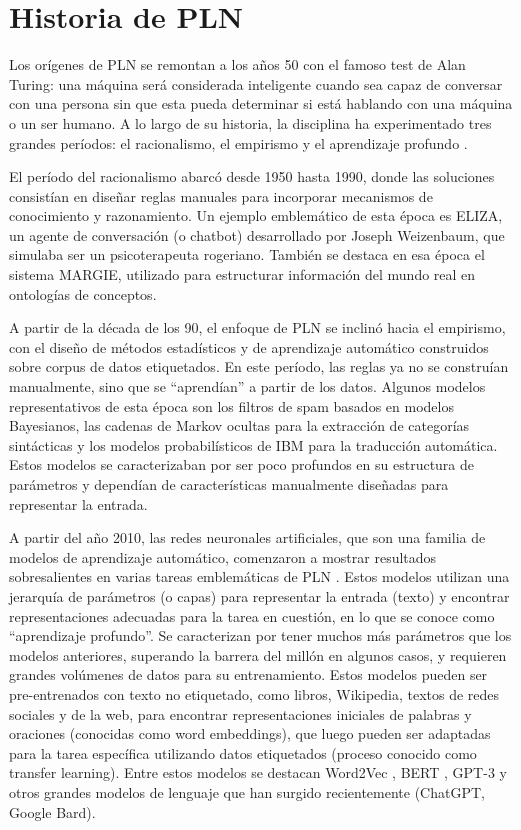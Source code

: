 \section{Historia de PLN}

Los orígenes de PLN se remontan a los años 50 con el famoso test de Alan Turing: una máquina será considerada inteligente cuando sea capaz de conversar con una persona sin que esta pueda determinar si está hablando con una máquina o un ser humano. A lo largo de su historia, la disciplina ha experimentado tres grandes períodos: el racionalismo, el empirismo y el aprendizaje profundo \cite{deng2018deep}.

El período del racionalismo abarcó desde 1950 hasta 1990, donde las soluciones consistían en diseñar reglas manuales para incorporar mecanismos de conocimiento y razonamiento. Un ejemplo emblemático de esta época es ELIZA, un agente de conversación (o chatbot) desarrollado por Joseph Weizenbaum, que simulaba ser un psicoterapeuta rogeriano. También se destaca en esa época el sistema MARGIE, utilizado para estructurar información del mundo real en ontologías de conceptos.

A partir de la década de los 90, el enfoque de PLN se inclinó hacia el empirismo, con el diseño de métodos estadísticos y de aprendizaje automático construidos sobre corpus de datos etiquetados. En este período, las reglas ya no se construían manualmente, sino que se ``aprendían'' a partir de los datos. Algunos modelos representativos de esta época son los filtros de spam basados en modelos Bayesianos, las cadenas de Markov ocultas para la extracción de categorías sintácticas y los modelos probabilísticos de IBM para la traducción automática. Estos modelos se caracterizaban por ser poco profundos en su estructura de parámetros y dependían de características manualmente diseñadas para representar la entrada.

A partir del año 2010, las redes neuronales artificiales, que son una familia de modelos de aprendizaje automático, comenzaron a mostrar resultados sobresalientes en varias tareas emblemáticas de PLN \cite{collobert2011natural}. Estos modelos utilizan una jerarquía de parámetros (o capas) para representar la entrada (texto) y encontrar representaciones adecuadas para la tarea en cuestión, en lo que se conoce como ``aprendizaje profundo''. Se caracterizan por tener muchos más parámetros que los modelos anteriores, superando la barrera del millón en algunos casos, y requieren grandes volúmenes de datos para su entrenamiento. Estos modelos pueden ser pre-entrenados con texto no etiquetado, como libros, Wikipedia, textos de redes sociales y de la web, para encontrar representaciones iniciales de palabras y oraciones (conocidas como word embeddings), que luego pueden ser adaptadas para la tarea específica utilizando datos etiquetados (proceso conocido como transfer learning). Entre estos modelos se destacan Word2Vec \cite{Mikolov2013}, BERT \cite{kenton2019bert}, GPT-3 \cite{brown2020language} y otros grandes modelos de lenguaje que han surgido recientemente (ChatGPT, Google Bard).

